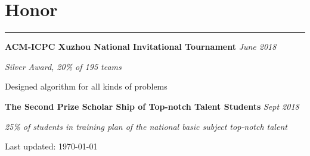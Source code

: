 \documentclass[letterpaper]{article}
\def\footerlink{}
\renewenvironment{itemize}{
  \begin{list}{}{
    \setlength{\leftmargin}{1.5em}
  }
}{
  \end{list}
}
\begin{document}
\section*{Honor}
\noindent\rule[10pt]{\textwidth}{0.2pt}\vspace{-30pt}
\begin{itemize}
  \setlength{\itemsep}{-2pt}
  \item {\bfseries{ACM-ICPC Xuzhou National Invitational Tournament}} \hfill {\it June 2018}
  \item {\it Silver Award, 20\% of 195 teams}
  \vspace{-6pt} 
  \begin{itemize}
    \setlength{\itemsep}{-2pt}
    \item[$\circ$] {Designed algorithm for all kinds of problems}
  \end{itemize}
  \item {\bfseries{The Second Prize Scholar Ship of Top-notch Talent Students} }\hfill {\it Sept 2018}
  \item {\it 25\% of students in training plan of the national basic subject top-notch talent}
\end{itemize}

\begin{center}
  \begin{footnotesize}
    Last updated: \today \\
    \href{\footerlink}{\texttt{\footerlink}}
  \end{footnotesize}
\end{center}
\end{document}
